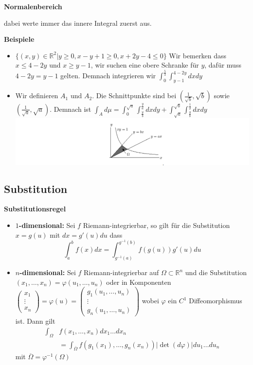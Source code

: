 \documentclass[25pt]{sciposter}
\newcommand{\R}{\mathbb{R}}
\newenvironment{method}[1]{\begin{mdframed}[backgroundcolor=blue!10,innertopmargin=15pt, innerbottommargin=15pt, nobreak=true]
		\textbf{#1 }
	}
	{ 
	\end{mdframed}
}
\newcommand{\TODO}[1]{\todo[inline]{\Large TODO:  #1}}
\begin{document}
\begin{multicols}{3}
\begin{method}{Normalenbereich}
	dabei werte immer das innere Integral zuerst aus.
\end{method}

\textbf{Beispiele}

\begin{itemize}
	\item $\{(x,y)\in\R^2 | y \geq 0 , x-y + 1 \geq 0 , x + 2y -4 \leq 0\}$ Wir bemerken dass $x\leq 4-2y$ und $x\geq y-1$, wir suchen eine obere Schranke für $y$, dafür muss $4-2y = y-1$ gelten. Demnach integrieren wir $\int_{0}^{\frac{5}{3}} \int_{y-1}^{4-2y} dx dy$
	\item 
	\TODO{check!!!}
	Wir definieren $A_1$ und $A_2$. Die Schnittpunkte sind bei $(\frac{1}{\sqrt{b}}, \sqrt{b})$ sowie $(\frac{1}{\sqrt{a}}, \sqrt{a})$. Demnach ist $\int_A d\mu = \int_{0}^{\sqrt{a}} \int_{\frac{y}{b}}^{\frac{y}{a}} dx dy + \int_{\sqrt{a}}^{\sqrt{b}} \int_{\frac{y}{b}}^{\frac{1}{y}} dx dy$
	\includegraphics[width=\linewidth]{serie13.png}
\end{itemize}





\subsection*{Substitution}

\begin{method}{Substitutionsregel}
	\begin{itemize}
		\item \textbf{$1$-dimensional:} Sei $f$ Riemann-integrierbar, so gilt für die Substitution $x = g(u)$ mit $dx = g'(u)du$ dass
		$$\int_{a}^{b} f(x) dx = \int_{g^{-1}(a)}^{g^{-1}(b)} f(g(u))g'(u)du$$
		\item \textbf{$n$-dimensional:} Sei $f$ Riemann-integrierbar auf $\Omega \subset \R^n$ und die Substitution $(x_1,\ldots,x_n) = \varphi(u_1,\ldots,u_n)$ oder in Komponenten $	\begin{pmatrix}
x_1\\ \vdots\\x_n
		\end{pmatrix} = \varphi(u) = 	\begin{pmatrix}
		g_1(u_1,\ldots,u_n)\\
		\vdots \\
		g_n(u_1,\ldots,u_n)
		\end{pmatrix}$ wobei $\varphi$ ein $C^1$ Diffeomorphismus ist. Dann gilt
		\begin{align*}
			\int_\Omega &f(x_1,\ldots , x_n) dx_1\ldots dx_n \\ &= \int_{\overline{\Omega}} f(g_1(x_1),\ldots , g_n(x_n)) |\operatorname{det}(d\varphi) | du_1\ldots du_n
		\end{align*}
		mit $\overline{\Omega} = \varphi^{-1}(\Omega)$
	\end{itemize}
\end{method}



\end{multicols}
\end{document}
